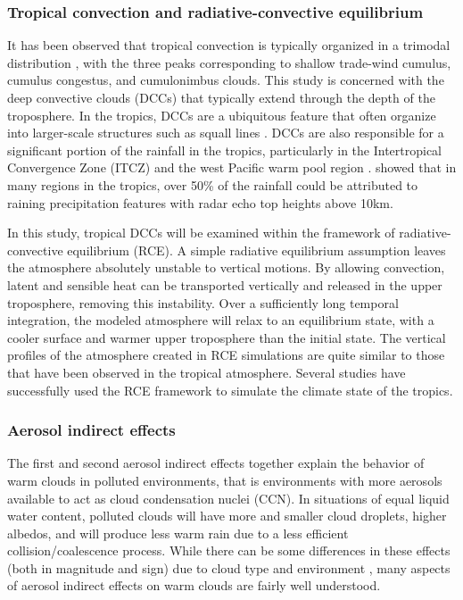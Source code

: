 \subsubsection{Tropical convection and radiative-convective equilibrium}
It has been observed that tropical convection is typically organized in a trimodal distribution \citep{Johnson:1999p1673,Posselt:2008p8667}, with the three peaks corresponding to shallow trade-wind cumulus, cumulus congestus, and cumulonimbus clouds.  This study is concerned with the deep convective clouds (DCCs) that typically extend through the depth of the troposphere.  In the tropics, DCCs are a ubiquitous feature that often organize into larger-scale structures such as squall lines \citep{Rickenbach:1998p10}. DCCs are also responsible for a significant portion of the rainfall in the tropics, particularly in the Intertropical Convergence Zone (ITCZ) and the west Pacific warm pool region \citep{Haynes:2007p3667}.  \citet{liuprecip} showed that in many regions in the tropics, over 50\% of the rainfall could be attributed to raining precipitation features with radar echo top heights above 10km.

In this study, tropical DCCs will be examined within the framework of radiative-convective equilibrium (RCE).  A simple radiative equilibrium assumption leaves the atmosphere absolutely unstable to vertical motions.  By allowing convection, latent and sensible heat can be transported vertically and released in the upper troposphere, removing this instability.  Over a sufficiently long temporal integration, the modeled atmosphere will relax to an equilibrium state, with a cooler surface and warmer upper troposphere than the initial state.  The vertical profiles of the atmosphere created in RCE simulations are quite similar to those that have been observed in the tropical atmosphere.  Several studies \citep{HELD:1993p8792,Tompkins:1998p8793,brethertonrce,Stephens:2008p6909,VanDenHeever:2011p7996} have successfully used the RCE framework to simulate the climate state of the tropics.

\subsubsection{Aerosol indirect effects}
The first and second aerosol indirect effects \citep{Twomey:1977p42,Albrecht:1989p347} together explain the behavior of warm clouds in polluted environments, that is environments with more aerosols available to act as cloud condensation nuclei (CCN).  In situations of equal liquid water content, polluted clouds will have more and smaller cloud droplets, higher albedos, and will produce less warm rain due to a less efficient collision/coalescence process.  While there can be some differences in these effects (both in magnitude and sign) due to cloud type \citep{Seifert:2006p86,VanDenHeever:2011p7996} and environment \citep{Khain:2008p35,Lebsock:2008p45,Fan:2009p7470,Storer:2010p8001}, many aspects of aerosol indirect effects on warm clouds are fairly well understood.  


